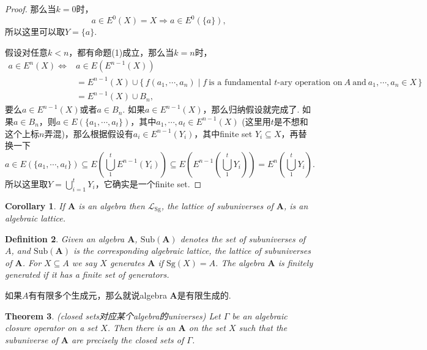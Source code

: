 \documentclass{article}
\newtheorem{theorem}{Theorem}[section]
\newtheorem{corollary}[theorem]{Corollary}
\newtheorem{definition}[theorem]{Definition}
\newcommand\Set[2]{\{\,#1\mid#2\,\}} %
\newcommand\Sg{\text{Sg}}
\newcommand\algebra{\mathbf{A}}
\newcommand\Sub[1]{\text{Sub}(#1)}
\begin{document}
\begin{proof}
那么当$k=0$时，
$$
a \in E^0(X) = X  \Rightarrow a \in E^0(\{a\}),
$$
所以这里可以取$Y = \{a\}$.

假设对任意$k < n$，都有命题(1)成立，那么当$k=n$时，
$$
\begin{aligned}
a \in E^n(X) \Leftrightarrow& a \in E(E^{n-1}(X))\\ &= E^{n-1}(X) \cup \Set{f(a_1,\cdots,a_n)}{f\ \text{is a fundamental $t$-ary operation on}\ A\ \text{and}\ a_1,\cdots,a_n \in X}\\ &= E^{n-1}(X) \cup B_n,
\end{aligned}
$$
要么$a \in E^{n-1}(X)$或者$a \in B_n$. 如果$a \in E^{n-1}(X)$，那么归纳假设就完成了. 如果$a \in B_n$，则$a \in E(\{a_1,\cdots,a_t\})$，其中$a_1,\cdots,a_t \in E^{n-1}(X)$ (这里用$t$是不想和这个上标$n$弄混)，那么根据假设有$a_i \in E^{n-1}(Y_i)$，其中finite set $Y_i \subseteq X$，再替换一下
$$
a \in E(\{a_1,\cdots,a_t\}) \subseteq  E(\bigcup\limits_{1}^{t} E^{n-1}(Y_i))  \subseteq E(E^{n-1}(\bigcup\limits_{1}^{t} Y_i)) = E^n(\bigcup\limits_{1}^{t} Y_i).
$$
所以这里取$Y = \bigcup\limits_{i=1}^{t} Y_i$，它确实是一个finite set.

\end{proof}

\begin{corollary}
\rm If $\mathbf{A}$ is an algebra then $\mathcal{L}_{\Sg}$, the lattice of subuniverses of $\mathbf{A}$, is an algebraic lattice.
\end{corollary}

\newpage
\begin{definition}
\rm Given an algebra $\algebra$, {\color{red} $\Sub{\algebra}$} denotes the set of subuniverses of $A$, and $\Sub{\algebra}$ is the corresponding algebraic lattice, the lattice of subuniverses of $\algebra$. For $X \subseteq A$ we say $X$ generates $\algebra$ if $\Sg(X) = A$. The algebra $\algebra$ is finitely generated if it has a finite set of generators.
\end{definition}

{\color{blue} 如果$A$有有限多个生成元，那么就说algebra $\algebra$是有限生成的}.


\begin{theorem}
\rm {\color{red} (closed sets对应某个algebra的universes)} Let $\Gamma$ be an algebraic closure operator on a set $X$. Then there is an $\algebra$ on the set $X$ such that the subuniverse of $\algebra$ are precisely the closed sets of $\Gamma$.
\end{theorem}
\end{document}
